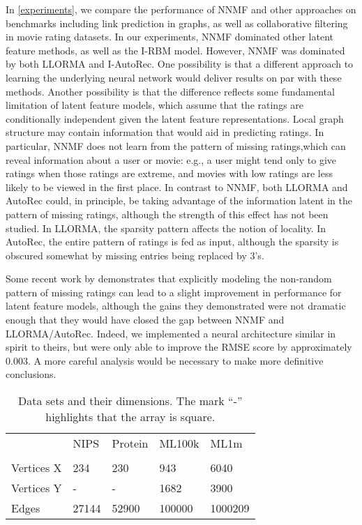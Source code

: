 \documentclass{article} \usepackage{iclr2016_conference,times}
\begin{document}
In \cref{experiments}, we compare the performance of NNMF and other approaches on benchmarks including link prediction in graphs, as well as collaborative filtering in movie rating datasets.
In our experiments, NNMF dominated other latent feature methods, as well as the I-RBM model.  However, NNMF was dominated by both LLORMA and I-AutoRec.
One possibility is that a different approach to learning the underlying neural network would deliver results on par with these methods. 
Another possibility is that the difference reflects some fundamental limitation of latent feature models, which assume that the ratings are conditionally independent given the latent feature representations. 
Local graph structure may contain information that would aid in predicting ratings.
In particular, NNMF does not learn from the pattern of missing ratings,which can reveal information about a user or movie: e.g., a user might tend only to give ratings when those ratings are extreme, and movies with low ratings are less likely to be viewed in the first place.
In contrast to NNMF, both LLORMA and AutoRec could, in principle, be taking advantage of the information latent in the pattern of missing ratings, although the strength of this effect has not been studied.  In LLORMA, the sparsity pattern affects the notion of locality.  In AutoRec, the entire pattern of ratings is fed as input, although the sparsity is obscured somewhat by missing entries being replaced by 3's.

Some recent work by \citet{LHG14} demonstrates that explicitly modeling the non-random pattern of missing ratings can lead to a slight improvement in performance for latent feature models, although the gains they demonstrated were not dramatic enough that they would have closed the gap between NNMF and LLORMA/AutoRec.
Indeed, we implemented a neural architecture similar in spirit to theirs, but were only able to improve the RMSE score by approximately $0.003$.   A more careful analysis would be necessary to make more definitive conclusions. 











\begin{table}[t]
\centering
\begin{tabular}{lllll}
           & NIPS  & Protein & ML100k & ML1m    \\
&           \\
Vertices X & 234   & 230     & 943    & 6040    \\
Vertices Y & -   & -       & 1682   & 3900    \\
Edges      & 27144 &   52900      & 100000 & 1000209
\end{tabular}
\caption{Data sets and their dimensions.  The mark ``-'' highlights that the array is square.}
\label{datasetsinfo}
\end{table}
\end{document}
